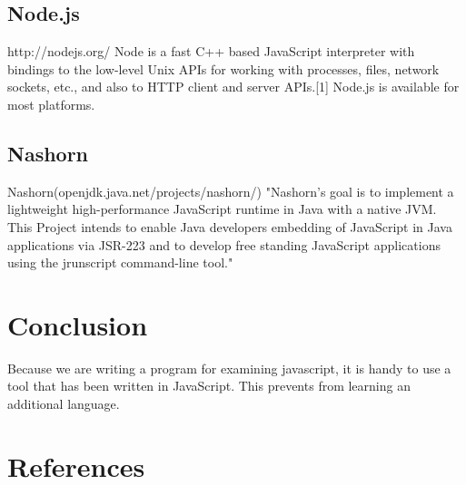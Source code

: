 \documentclass{article}
\begin{document}
\subsection{Node.js}
http://nodejs.org/
Node is a fast C++ based JavaScript interpreter with bindings to the low-level Unix APIs for working with processes, files, network sockets, etc., and also to HTTP client and server APIs.[1]
Node.js is available for most platforms.

\subsection{Nashorn}Nashorn(openjdk.java.net/projects/nashorn/)
"Nashorn's goal is to implement a lightweight high-performance JavaScript runtime in Java with a native JVM. This Project intends to enable Java developers embedding of JavaScript in Java applications via JSR-223 and to develop free standing JavaScript applications using the jrunscript command-line tool."



\section{Conclusion}
Because we are writing a program for examining javascript, it is handy to use a tool that has been written in JavaScript.
This prevents from learning an additional language.

\section{References}
\end{document}

